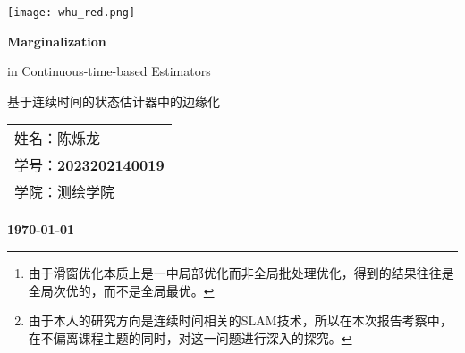 \documentclass[12pt, twocolumn]{article}
\title{\normf{编程：观测值逐次更新的扩展卡尔曼滤波器}}
\author{\normf 姓名：陈烁龙\;\;\;学号：2023202140019\;\;\;学院：测绘学院}
\date{\normf{\today}}
\newcommand\normf{\fangsong}
\begin{document}
	\begin{titlepage}
	    \centering
	    \texttt{[image: whu\_red.png]}\par\vspace{1cm}
	    \vspace{4cm}
	    {\huge\kaishu\bfseries Marginalization\par in Continuous-time-based Estimators\par 基于连续时间的状态估计器中的边缘化 \par}
	    \vspace{3cm}
	    {\Large\kaishu 
	    \begin{center}\begin{tabular}{l}
	    姓名：陈烁龙\\
	    学号：\bfseries 2023202140019\\
	    学院：测绘学院
	    \end{tabular}\end{center}
	     \par}
	    
	
	    \vfill
	
	    {\large\kaishu\bfseries \today\par}
	\end{titlepage}
 		\thispagestyle{empty}
		\clearpage
		
		\tableofcontents
		\newpage
		\listoffigures
		
		\clearpage
		\setcounter{page}{1}
	
	
	\begin{abstract}
		\normf\bfseries
		近几年来，同时定位与地图构建(Simultaneous Localization And Mapping, SLAM)技术已经较为成熟，且被广泛应用于诸如自动驾驶、机器人领域中，来提供连续的位置服务和精确、一致的先验地图。出于实时性的要求，SLAM算法需要在优化精度和优化效率之间平衡。目前比较主流的方法是采用滑窗(Sliding Window)优化加边缘化(Marginalization)的策略，能够在保证实时性的同时，尽可能地减少局部优化\footnote{\normf 由于滑窗优化本质上是一中局部优化而非全局批处理优化，得到的结果往往是全局次优的，而不是全局最优。}带来的精度损失。
		
		目前绝大多的SLAM算法在进行优化的时候都针对的是离散位姿状态序列，是一种离散时间(Discrete Time，DT)估计方法。而相对应的连续时间(Continuous Time，CT)估计方法则使用时间域上的连续函数(比如B样条函数)表达位姿轨迹，优化的是连续函数的参量。相比于DT估计方法，CT估计方法在考虑了运动连续性的同时，能够更有利于异步、高频多源传感器的融合。CT方法目前在SLAM技术上应用的不是很多，主要是因为其优化量较大，效率较低。
		
		本文聚焦于基于CT的估计器中的边缘化问题，进行CT估计器中边缘化算法的探究、实现和测试\footnote{\normf 由于本人的研究方向是连续时间相关的SLAM技术，所以在本次报告考察中，在不偏离课程主题的同时，对这一问题进行深入的探究。}。
	\end{abstract}
	
\end{document}

